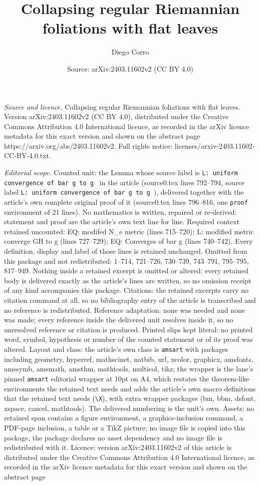 \documentclass[10pt,a4paper]{amsart}
\title[Collapsing regular Riemannian foliations with flat leaves]{Collapsing regular Riemannian foliations with flat leaves}
\author{Diego Corro}
\date{Source: arXiv:2403.11602v2 (CC BY 4.0)}
\begin{document}
\maketitle

\noindent\emph{Source and licence.} Collapsing regular Riemannian foliations with flat leaves. Version arXiv:2403.11602v2 (CC BY 4.0), distributed under the Creative Commons Attribution 4.0 International licence, as recorded in the arXiv licence metadata for this exact version and shown on the abstract page https://arxiv.org/abs/2403.11602v2. Full rights notice: licenses/arxiv-2403.11602-CC-BY-4.0.txt.\par\smallskip

\noindent\textit{Editorial scope.} Counted unit: the Lemma whose source label is \texttt{L: uniform convergence of bar g to g } in the article (source0.tex lines 792--794, source label \texttt{L: uniform convergence of bar g to g }), delivered together with the article's own complete original proof of it (source0.tex lines 796--816, one \texttt{proof} environment of 21 lines). No mathematics is written, repaired or re-derived: statement and proof are the article's own text line for line. Required context retained uncounted: EQ: modifed N\_e metric (lines 715--720); L: modified metric converge GH to g (lines 727--729); EQ: Converges of bar g (lines 740--742). Every definition, display and label of those lines is retained unchanged. Omitted from this package and not redistributed: 1--714, 721--726, 730--739, 743--791, 795--795, 817--949. Nothing inside a retained excerpt is omitted or altered: every retained body is delivered exactly as the article's lines are written, so no omission receipt of any kind accompanies this package. Citations: the retained excerpts carry no citation command at all, so no bibliography entry of the article is transcribed and no reference is redistributed. Reference adaptation: none was needed and none was made; every reference inside the delivered unit resolves inside it, so no unresolved reference or citation is produced. Printed slips kept literal: no printed word, symbol, hypothesis or number of the counted statement or of its proof was altered. Layout and class: the article's own class is \texttt{amsart} with packages including geometry, hyperref, mathscinet, natbib, url, xcolor, graphicx, amsfonts, amssymb, amsmath, amsthm, mathtools, multicol, tikz; the wrapper is the lane's pinned \texttt{amsart} editorial wrapper at 10pt on A4, which restates the theorem-like environments the retained text needs and adds the article's own macro definitions that the retained text needs (\texttt{\textbackslash X}), with extra wrapper packages (bm, bbm, dsfont, xspace, cancel, mathtools). The delivered numbering is the unit's own. Assets: no retained span contains a figure environment, a graphics-inclusion command, a PDF-page inclusion, a table or a TikZ picture; no image file is copied into this package, the package declares no asset dependency and no image file is redistributed with it. Licence: version arXiv:2403.11602v2 of this article is distributed under the Creative Commons Attribution 4.0 International licence, as recorded in the arXiv licence metadata for this exact version and shown on the abstract page 
\end{document}
